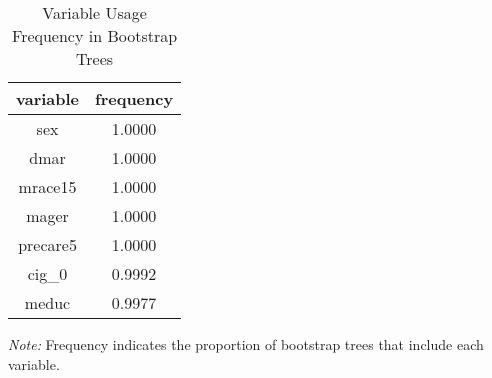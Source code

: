 \begin{table}[ht]
\centering
\begin{tabular}{cc}
 variable & frequency \\ 
\midrule
 sex & 1.0000 \\ 
  dmar & 1.0000 \\ 
  mrace15 & 1.0000 \\ 
  mager & 1.0000 \\ 
  precare5 & 1.0000 \\ 
  cig_0 & 0.9992 \\ 
  meduc & 0.9977 \\ 
  \end{tabular}
\caption*{\textit{Note:} Frequency indicates the proportion of bootstrap trees that include each variable.}
\caption{Variable Usage Frequency in Bootstrap Trees} 
\label{tab:var_freq}
\end{table}
